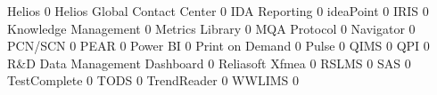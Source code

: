 \documentclass{article}
\begin{document}
\begin{Schunk}
\begin{Soutput}
  Helios                                                                                   0
  Helios Global Contact Center                                                             0
  IDA Reporting                                                                            0
  ideaPoint                                                                                0
  IRIS                                                                                     0
  Knowledge Management                                                                     0
  Metrics Library                                                                          0
  MQA Protocol                                                                             0
  Navigator                                                                                0
  PCN/SCN                                                                                  0
  PEAR                                                                                     0
  Power BI                                                                                 0
  Print on Demand                                                                          0
  Pulse                                                                                    0
  QIMS                                                                                     0
  QPI                                                                                      0
  R&D Data Management Dashboard                                                            0
  Reliasoft Xfmea                                                                          0
  RSLMS                                                                                    0
  SAS                                                                                      0
  TestComplete                                                                             0
  TODS                                                                                     0
  TrendReader                                                                              0
  WWLIMS                                                                                   0
                                                           

\end{Soutput}
\end{Schunk}
\end{document}
